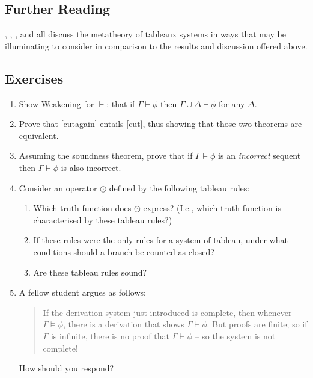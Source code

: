 {\small

\subsection*{Further Reading}
\citet{smullyan}, \citet{bevpospa}, \citet{hodges}, \citet[ch. 4]{bosintlo} and \citet{jefforlos}  all discuss the metatheory of tableaux systems in ways that may be illuminating to consider in comparison to the results and discussion offered above.

\subsection*{Exercises} \label{ex:tablmeta}

\begin{enumerate}
\item Show Weakening for $\vdash$: that if $\Gamma\vdash \phi$ then $\Gamma\cup \Delta \vdash \phi$ for any $\Delta$.
\item Prove that \autoref{cutagain} entails \autoref{cut}, thus showing that those two theorems are equivalent.
\item Assuming the  soundness theorem, prove that if $\Gamma \vDash \phi$  is an \emph{incorrect} sequent  then $\Gamma \vdash \phi$ is also incorrect.


\item Consider  an operator $\odot$ defined by the following tableau rules: 
 \begin{center}
 {\leaf{$(\phi \odot \phi)$\\$(\psi \odot \psi)$}\qobitree} \qquad
 {\leaf{$\phi$}\leaf{\quad$\psi$\qquad}\qobitree}\end{center}

\begin{enumerate}
 \item  Which truth-function does $\odot$ express? (I.e., which truth function is characterised by these tableau rules?)
 \item If these rules were the only rules for a system of tableau,
 under what conditions should a branch be counted as closed?
\item Are these tableau rules sound?
 \end{enumerate}
 \item A fellow student argues as follows: \begin{quotation}
	If the derivation system just introduced is complete, then whenever $\Gamma \vDash \phi$, there is a derivation that shows $\Gamma \vdash \phi$. But proofs are finite; so if $\Gamma$ is infinite, there is no proof that $\Gamma \vdash \phi$ – so the system is not complete!
\end{quotation} How should you respond?
 \end{enumerate}


}

